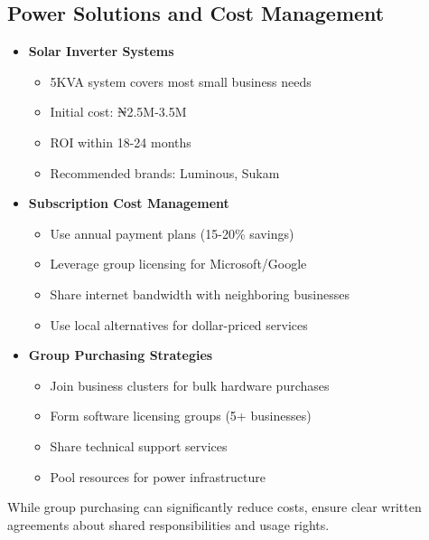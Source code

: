\subsection{Power Solutions and Cost Management}\label{subsec:power-solutions}
\begin{tcolorbox}[colback=white,colframe=primarydark,title=\textbf{Modern Power Solutions}]
\begin{itemize}
    \item \textbf{Solar Inverter Systems}
    \begin{itemize}
        \item 5KVA system covers most small business needs
        \item Initial cost: ₦2.5M-3.5M
        \item ROI within 18-24 months
        \item Recommended brands: Luminous, Sukam
    \end{itemize}

    \item \textbf{Subscription Cost Management}
    \begin{itemize}
        \item Use annual payment plans (15-20\% savings)
        \item Leverage group licensing for Microsoft/Google
        \item Share internet bandwidth with neighboring businesses
        \item Use local alternatives for dollar-priced services
    \end{itemize}

    \item \textbf{Group Purchasing Strategies}
    \begin{itemize}
        \item Join business clusters for bulk hardware purchases
        \item Form software licensing groups (5+ businesses)
        \item Share technical support services
        \item Pool resources for power infrastructure
    \end{itemize}
\end{itemize}
\end{tcolorbox}

\begin{warningbox}
While group purchasing can significantly reduce costs, ensure clear written agreements about shared responsibilities and usage rights.
\end{warningbox}

